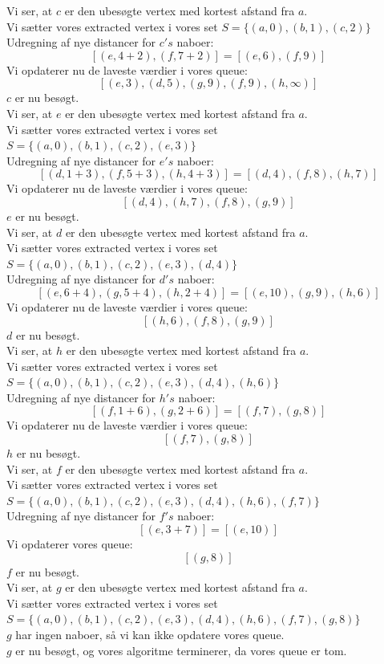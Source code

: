 \documentclass[a4paper,12pt]{article}
\begin{document}
Vi ser, at $c$ er den ubesøgte vertex med kortest afstand fra $a$.\\
Vi sætter vores extracted vertex i vores set $S = \{(a,0),(b,1),(c,2)\}$\\
Udregning af nye distancer for $c's$ naboer:
\[
[(e,4+2),(f,7+2)] = [(e,6),(f,9)]
\]
Vi opdaterer nu de laveste værdier i vores queue:
\[
[(e,3),(d,5),(g,9),(f,9),(h,\infty)]
\]
$c$ er nu besøgt.\\

Vi ser, at $e$ er den ubesøgte vertex med kortest afstand fra $a$.\\
Vi sætter vores extracted vertex i vores set $S = \{(a,0),(b,1),(c,2),(e,3)\}$\\
Udregning af nye distancer for $e's$ naboer:
\[
[(d,1+3),(f,5+3),(h,4+3)] = [(d,4),(f,8),(h,7)]
\]
Vi opdaterer nu de laveste værdier i vores queue:
\[
[(d,4),(h,7),(f,8),(g,9)]
\]
$e$ er nu besøgt.\\

Vi ser, at $d$ er den ubesøgte vertex med kortest afstand fra $a$.\\
Vi sætter vores extracted vertex i vores set $S = \{(a,0),(b,1),(c,2),(e,3),(d,4)\}$\\
Udregning af nye distancer for $d's$ naboer:
\[
[(e,6+4),(g,5+4),(h,2+4)] = [(e,10),(g,9),(h,6)]
\]
Vi opdaterer nu de laveste værdier i vores queue:
\[
[(h,6),(f,8),(g,9)]
\]
$d$ er nu besøgt.\\

Vi ser, at $h$ er den ubesøgte vertex med kortest afstand fra $a$.\\
Vi sætter vores extracted vertex i vores set $S = \{(a,0),(b,1),(c,2),(e,3),(d,4),(h,6)\}$\\
Udregning af nye distancer for $h's$ naboer:
\[
[(f,1+6),(g,2+6)] = [(f,7),(g,8)]
\]
Vi opdaterer nu de laveste værdier i vores queue:
\[
[(f,7),(g,8)]
\]
$h$ er nu besøgt.\\

Vi ser, at $f$ er den ubesøgte vertex med kortest afstand fra $a$.\\
Vi sætter vores extracted vertex i vores set $S = \{(a,0),(b,1),(c,2),(e,3),(d,4),(h,6),(f,7)\}$\\
Udregning af nye distancer for $f's$ naboer:
\[
[(e,3+7)] = [(e,10)]
\]
Vi opdaterer vores queue:
\[
[(g,8)]
\]
$f$ er nu besøgt.\\

Vi ser, at $g$ er den ubesøgte vertex med kortest afstand fra $a$.\\
Vi sætter vores extracted vertex i vores set $S = \{(a,0),(b,1),(c,2),(e,3),(d,4),(h,6),(f,7),(g,8)\}$\\
$g$ har ingen naboer, så vi kan ikke opdatere vores queue.\\
$g$ er nu besøgt, og vores algoritme terminerer, da vores queue er tom.\\
\end{document}
